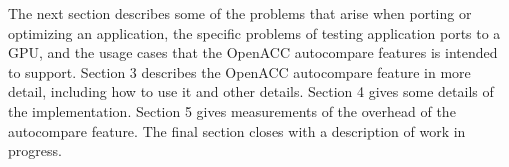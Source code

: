 The next section describes some of the problems that arise when porting or optimizing an application, the specific problems of testing application ports to a GPU, and the usage cases that the OpenACC autocompare features is intended to support.
Section 3 describes the OpenACC autocompare feature in more detail, including how to use it and other details.
Section 4 gives some details of the implementation.
Section 5 gives measurements of the overhead of the autocompare feature.
The final section closes with a description of work in progress.

